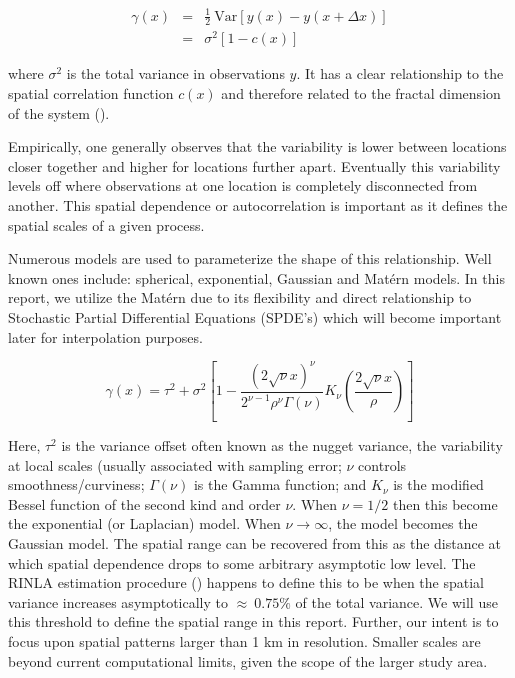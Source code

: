 \documentclass[letterpaper,portrait,11pt]{scrartcl}
\numberwithin{equation}{section}		%
\numberwithin{figure}{section}		%
\numberwithin{table}{section}				%
\begin{document}
\begin{eqnarray*}
\label{eq:semivariogram}
\gamma(x) &=& \frac{1}{2} \ \textrm{Var} [ y(x) - y(x + \Delta x)]  \\
&=& \sigma^2 [1-c(x)] 
\end{eqnarray*}

where $\sigma^2$ is the total variance in observations $y$. It has a clear relationship to the spatial correlation function $c(x)$ and therefore related to the fractal dimension of the system (\cite{Schepers:2002:fractals}). 

Empirically, one generally observes that the variability is lower between locations closer together and higher for locations further apart. Eventually this variability levels off where observations at one location is completely disconnected from another. This spatial dependence or autocorrelation is important as it defines the spatial scales of a given process. 

Numerous models are used to parameterize the shape of this relationship. Well known ones include: spherical, exponential, Gaussian and Mat\'{e}rn models. In this report, we utilize the Mat\'{e}rn due to its flexibility and direct relationship to Stochastic Partial Differential Equations (SPDE's) which will become important later for interpolation purposes. 

\begin{equation}
\gamma(x) = \tau^2 + \sigma^2 [ 1 - \frac{{(2\sqrt{\nu}x)}^\nu}{2^{\nu-1} \rho^{\nu} \Gamma(\nu)}
 K_\nu(\frac{2\sqrt{\nu}x}{\rho} ) ]
\end{equation}

Here, $\tau^2$ is the variance offset often known as the nugget variance, the variability at local scales (usually associated with sampling error; $\nu$ controls smoothness/curviness; $\Gamma(\nu)$ is the Gamma function; and $K_{\nu}$ is the modified Bessel function of the second kind and order $\nu$. When $\nu=1/2$ then this become the exponential (or Laplacian) model. When $\nu \longrightarrow \infty$, the model becomes the Gaussian model. The spatial range can be recovered from this as the distance at which spatial dependence drops to some arbitrary asymptotic low level. The RINLA estimation procedure (\cite{rinla}) happens to define this to be when the spatial variance increases asymptotically to $\approx~0.75\%$ of the total variance. We will use this threshold to define the spatial range in this report. Further, our intent is to focus upon spatial patterns larger than 1 km in resolution. Smaller scales are beyond current computational limits, given the scope of the larger study area.
\end{document}

